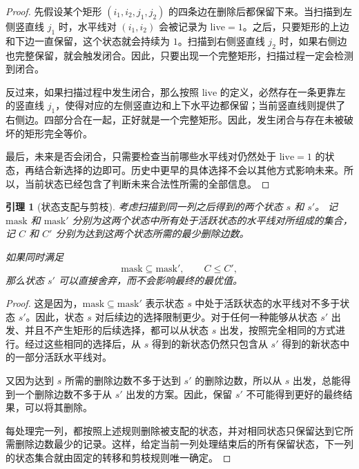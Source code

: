 \documentclass[11pt]{ctexart}
\newtheorem{lemma}[theorem]{引理}
\theoremstyle{definition}
\begin{document}
\begin{proof}
先假设某个矩形 $(i_1,i_2,j_1,j_2)$ 的四条边在删除后都保留下来。当扫描到左侧竖直线 $j_1$ 时，水平线对 $(i_1,i_2)$ 会被记录为 $\mathrm{live}=1$。之后，只要矩形的上边和下边一直保留，这个状态就会持续为 $1$。扫描到右侧竖直线 $j_2$ 时，如果右侧边也完整保留，就会触发闭合。因此，只要出现一个完整矩形，扫描过程一定会检测到闭合。

反过来，如果扫描过程中发生闭合，那么按照 $\mathrm{live}$ 的定义，必然存在一条更靠左的竖直线 $j_1$，使得对应的左侧竖直边和上下水平边都保留；当前竖直线则提供了右侧边。四部分合在一起，正好就是一个完整矩形。因此，发生闭合与存在未被破坏的矩形完全等价。

最后，未来是否会闭合，只需要检查当前哪些水平线对仍然处于 $\mathrm{live}=1$ 的状态，再结合新选择的边即可。历史中更早的具体选择不会以其他方式影响未来。所以，当前状态已经包含了判断未来合法性所需的全部信息。
\end{proof}

\begin{lemma}[状态支配与剪枝]\label{lem:prune}
考虑扫描到同一列之后得到的两个状态 $s$ 和 $s'$。
记 $\mathrm{mask}$ 和 $\mathrm{mask}'$ 分别为这两个状态中所有处于活跃状态的水平线对所组成的集合，记 $C$ 和 $C'$ 分别为达到这两个状态所需的最少删除边数。

如果同时满足
\[
\mathrm{mask}\subseteq\mathrm{mask}',
\qquad C\le C',
\]
那么状态 $s'$ 可以直接舍弃，而不会影响最终的最优值。

\end{lemma}

\begin{proof}
这是因为，$\mathrm{mask}\subseteq\mathrm{mask}'$ 表示状态 $s$ 中处于活跃状态的水平线对不多于状态 $s'$。因此，状态 $s$ 对后续边的选择限制更少。对于任何一种能够从状态 $s'$ 出发、并且不产生矩形的后续选择，都可以从状态 $s$ 出发，按照完全相同的方式进行。经过这些相同的选择后，从 $s$ 得到的新状态仍然只包含从 $s'$ 得到的新状态中的一部分活跃水平线对。

又因为达到 $s$ 所需的删除边数不多于达到 $s'$ 的删除边数，所以从 $s$ 出发，总能得到一个删除边数不多于从 $s'$ 出发的方案。因此，保留 $s'$ 不可能得到更好的最终结果，可以将其删除。

每处理完一列，都按照上述规则删除被支配的状态，并对相同状态只保留达到它所需删除边数最少的记录。这样，给定当前一列处理结束后的所有保留状态，下一列的状态集合就由固定的转移和剪枝规则唯一确定。
\end{proof}
\end{document}
